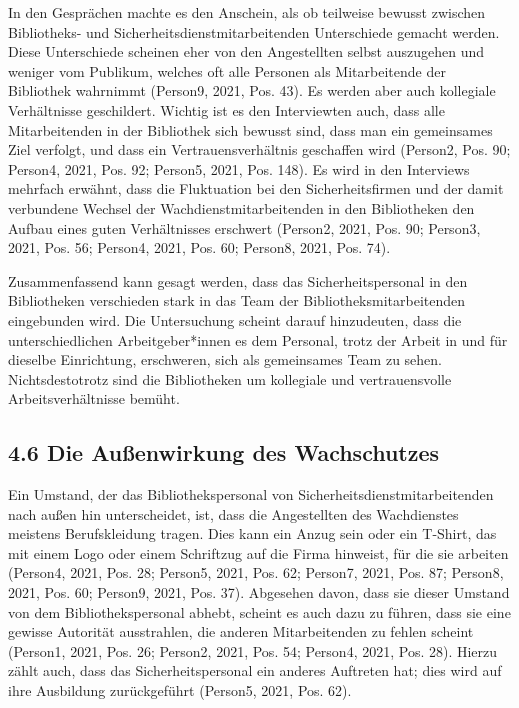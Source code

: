 \documentclass[a4paper,
fontsize=11pt,
oneside,
numbers=noperiodatend,
parskip=half-,
bibliography=totoc,
final
]{scrartcl}
\begin{document}
In den Gesprächen machte es den Anschein, als ob teilweise bewusst
zwischen Bibliotheks- und Sicherheitsdienstmitarbeitenden Unterschiede
gemacht werden. Diese Unterschiede scheinen eher von den Angestellten
selbst auszugehen und weniger vom Publikum, welches oft alle Personen
als Mitarbeitende der Bibliothek wahrnimmt (Person9, 2021, Pos. 43). Es
werden aber auch kollegiale Verhältnisse geschildert. Wichtig ist es den
Interviewten auch, dass alle Mitarbeitenden in der Bibliothek sich
bewusst sind, dass man ein gemeinsames Ziel verfolgt, und dass ein
Vertrauensverhältnis geschaffen wird (Person2, Pos. 90; Person4, 2021,
Pos. 92; Person5, 2021, Pos. 148). Es wird in den Interviews mehrfach
erwähnt, dass die Fluktuation bei den Sicherheitsfirmen und der damit
verbundene Wechsel der Wachdienstmitarbeitenden in den Bibliotheken den
Aufbau eines guten Verhältnisses erschwert (Person2, 2021, Pos. 90;
Person3, 2021, Pos. 56; Person4, 2021, Pos. 60; Person8, 2021, Pos. 74).

Zusammenfassend kann gesagt werden, dass das Sicherheitspersonal in den
Bibliotheken verschieden stark in das Team der Bibliotheksmitarbeitenden
eingebunden wird. Die Untersuchung scheint darauf hinzudeuten, dass die
unterschiedlichen Arbeitgeber*innen es dem Personal, trotz der Arbeit in
und für dieselbe Einrichtung, erschweren, sich als gemeinsames Team zu
sehen. Nichtsdestotrotz sind die Bibliotheken um kollegiale und
vertrauensvolle Arbeitsverhältnisse bemüht.

\hypertarget{die-auuxdfenwirkung-des-wachschutzes}{%
\subsection{4.6 Die Außenwirkung des
Wachschutzes}\label{die-auuxdfenwirkung-des-wachschutzes}}

Ein Umstand, der das Bibliothekspersonal von
Sicherheitsdienstmitarbeitenden nach außen hin unterscheidet, ist, dass
die Angestellten des Wachdienstes meistens Berufskleidung tragen. Dies
kann ein Anzug sein oder ein T-Shirt, das mit einem Logo oder einem
Schriftzug auf die Firma hinweist, für die sie arbeiten (Person4, 2021,
Pos. 28; Person5, 2021, Pos. 62; Person7, 2021, Pos. 87; Person8, 2021,
Pos. 60; Person9, 2021, Pos. 37). Abgesehen davon, dass sie dieser
Umstand von dem Bibliothekspersonal abhebt, scheint es auch dazu zu
führen, dass sie eine gewisse Autorität ausstrahlen, die anderen
Mitarbeitenden zu fehlen scheint (Person1, 2021, Pos. 26; Person2, 2021,
Pos. 54; Person4, 2021, Pos. 28). Hierzu zählt auch, dass das
Sicherheitspersonal ein anderes Auftreten hat; dies wird auf ihre
Ausbildung zurückgeführt (Person5, 2021, Pos. 62).
\end{document}
